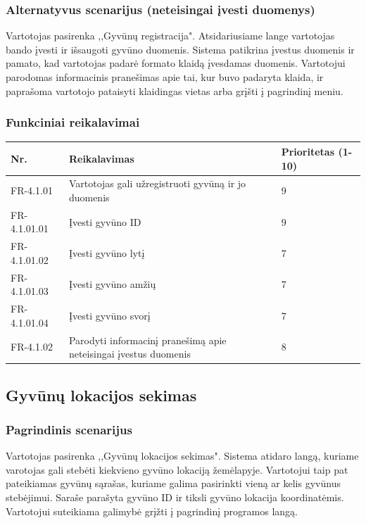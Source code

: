 \documentclass[oneside]{VUMIFPSkursinis}
\begin{document}
	\subsubsection{Alternatyvus scenarijus (neteisingai įvesti duomenys)}
	Vartotojas pasirenka ,,Gyvūnų registracija". Atsidariusiame lange vartotojas bando įvesti ir išsaugoti gyvūno duomenis. Sistema patikrina įvestus duomenis ir pamato, kad vartotojas padarė formato klaidą įvesdamas duomenis. Vartotojui parodomas informacinis pranešimas apie tai, kur buvo padaryta klaida, ir paprašoma vartotojo pataisyti klaidingas vietas arba grįšti į pagrindinį meniu.
\pagebreak
	\subsubsection{Funkciniai reikalavimai}

\begin{table}[htbp]
	\begin{tabularx}{1\textwidth}{ |P{2.5cm}|X|P{3cm }| }  \hline
	Nr. & Reikalavimas &  Prioritetas (1-10)  \\   \hline 
	FR-4.1.01 & Vartotojas gali užregistruoti gyvūną ir jo duomenis & 9  \\   \hline 
	FR-4.1.01.01 & Įvesti gyvūno ID & 9 \\   \hline
	FR-4.1.01.02 & Įvesti gyvūno lytį & 7 \\   \hline 
 	FR-4.1.01.03 & Įvesti gyvūno amžių & 7 \\   \hline
	FR-4.1.01.04 & Įvesti gyvūno svorį & 7 \\   \hline
	FR-4.1.02 & Parodyti informacinį pranešimą apie neteisingai įvestus duomenis & 8 \\   \hline
	
\end{tabularx}
\end{table}
\subsection{Gyvūnų lokacijos sekimas}
	\subsubsection{Pagrindinis scenarijus}
	Vartotojas pasirenka ,,Gyvūnų lokacijos sekimas". Sistema atidaro langą, kuriame varotojas gali stebėti kiekvieno gyvūno lokaciją žemėlapyje. Vartotojui taip pat pateikiamas gyvūnų sąrašas, kuriame galima pasirinkti vieną ar kelis gyvūnus stebėjimui. Saraše parašyta gyvūno ID ir tiksli gyvūno lokacija koordinatėmis. Vartotojui suteikiama galimybė grįžti į pagrindinį programos langą.
\end{document}
